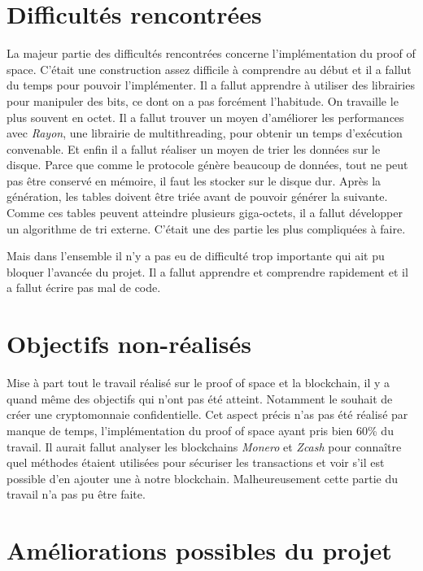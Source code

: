 \section{Difficultés rencontrées}

La majeur partie des difficultés rencontrées concerne l'implémentation du proof of space. C'était une construction assez difficile à comprendre au début et il a fallut du temps pour pouvoir l'implémenter. Il a fallut apprendre à utiliser des librairies pour manipuler des bits, ce dont on a pas forcément l'habitude. On travaille le plus souvent en octet. Il a fallut trouver un moyen d'améliorer les performances avec \emph{Rayon}, une librairie de multithreading, pour obtenir un temps d'exécution convenable. Et enfin il a fallut réaliser un moyen de trier les données sur le disque. Parce que comme le protocole génère beaucoup de données, tout ne peut pas être conservé en mémoire, il faut les stocker sur le disque dur. Après la génération, les tables doivent être triée avant de pouvoir générer la suivante. Comme ces tables peuvent atteindre plusieurs giga-octets, il a fallut développer un algorithme de tri externe. C'était une des partie les plus compliquées à faire.

Mais dans l'ensemble il n'y a pas eu de difficulté trop importante qui ait pu bloquer l'avancée du projet. Il a fallut apprendre et comprendre rapidement et il a fallut écrire pas mal de code.


\section{Objectifs non-réalisés}

Mise à part tout le travail réalisé sur le proof of space et la blockchain, il y a quand même des objectifs qui n'ont pas été atteint. Notamment le souhait de créer une cryptomonnaie confidentielle. Cet aspect précis n'as pas été réalisé par manque de temps, l'implémentation du proof of space ayant pris bien 60\% du travail. Il aurait fallut analyser les blockchains \emph{Monero} et \emph{Zcash} pour connaître quel méthodes étaient utilisées pour sécuriser les transactions et voir s'il est possible d'en ajouter une à notre blockchain. Malheureusement cette partie du travail n'a pas pu être faite.

\section{Améliorations possibles du projet}

